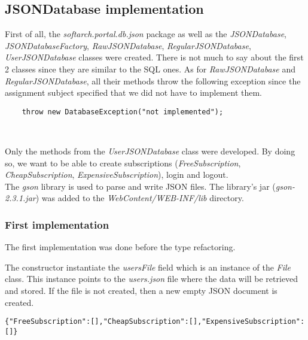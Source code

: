 \subsection{JSONDatabase implementation}

First of all, the \emph{softarch.portal.db.json} package as well as the
\emph{JSONDatabase}, \emph{JSONDatabaseFactory}, \emph{RawJSONDatabase},
\emph{RegularJSONDatabase}, \emph{UserJSONDatabase} classes were
created. There is not much to say about the first 2 classes since they
are similar to the SQL ones. As for \emph{RawJSONDatabase} and
\emph{RegularJSONDatabase}, all their methods throw the following exception
since the assignment subject specified that we did not have to implement them.\\

\begin{lstlisting}
    throw new DatabaseException("not implemented");
\end{lstlisting}
\

Only the methods from the \emph{UserJSONDatabase} class were developed.
By doing so, we want to be able to create subscriptions
(\emph{FreeSubscription}, \emph{CheapSubscription},
\emph{ExpensiveSubscription}), login and logout.\\

The \emph{gson}\cite{cite:gson} library is used to parse and write JSON files.
The library's jar (\emph{gson-2.3.1.jar}) was added to the
\emph{WebContent/WEB-INF/lib} directory.

\subsubsection{First implementation}

\begin{framewarning}
The first implementation was done before the type refactoring.
\end{framewarning}

The constructor instantiate the \emph{usersFile} field which is an
instance of the \emph{File} class. This instance points to the
\emph{users.json} file where the data will be retrieved and stored. If
the file is not created, then a new empty JSON document is created.\\

\begin{lstlisting}[caption={empty users.json document}]
{"FreeSubscription":[],"CheapSubscription":[],"ExpensiveSubscription":[]}
\end{lstlisting}
\

